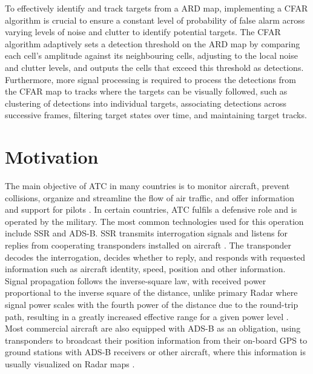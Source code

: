 To effectively identify and track targets from a \ac{ARD} map, implementing a \ac{CFAR} algorithm is crucial to ensure a constant level of probability of false alarm across varying levels of noise and clutter to identify potential targets. The \ac{CFAR} algorithm adaptively sets a detection threshold on the ARD map by comparing each cell's amplitude against its neighbouring cells, adjusting to the local noise and clutter levels, and outputs the cells that exceed this threshold as detections. Furthermore, more signal processing is required to process the detections from the \ac{CFAR} map to tracks where the targets can be visually followed, such as clustering of detections into individual targets, associating detections across successive frames, filtering target states over time, and maintaining target tracks.




\section{Motivation}
The main objective of \ac{ATC} in many countries is to monitor aircraft, prevent collisions, organize and streamline the flow of air traffic, and offer information and support for pilots \cite{Porcello2014}. In certain countries, \ac{ATC} fulfils a defensive role and is operated by the military. The most common technologies used for this operation include \ac{SSR} and \ac{ADS-B}. \ac{SSR} transmits interrogation signals and listens for replies from cooperating transponders installed on aircraft \cite{Porcello2014}. The transponder decodes the interrogation, decides whether to reply, and responds with requested information such as aircraft identity, speed, position and other information. Signal propagation follows the inverse-square law, with received power proportional to the inverse square of the distance, unlike primary \ac{Radar} where signal power scales with the fourth power of the distance due to the round-trip path, resulting in a greatly increased effective range for a given power level \cite{Porcello2014}. Most commercial aircraft are also equipped with \ac{ADS-B} as an obligation, using transponders to broadcast their position information from their on-board \ac{GPS} to ground stations with ADS-B receivers or other aircraft, where this information is usually visualized on \ac{Radar} maps \cite{Shiomi}. 

